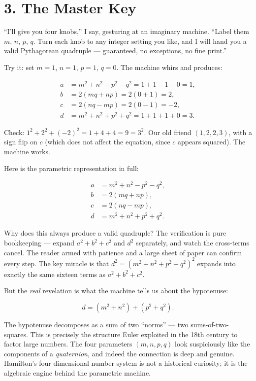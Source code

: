 \section{3. The Master Key}\label{ch12-the-master-key}

``I'll give you four knobs,'' I say, gesturing at an imaginary machine. ``Label them \(m\), \(n\), \(p\), \(q\). Turn each knob to any integer setting you like, and I will hand you a valid Pythagorean quadruple --- guaranteed, no exceptions, no fine print.''

Try it: set \(m = 1\), \(n = 1\), \(p = 1\), \(q = 0\). The machine whirs and produces:

\[\begin{aligned}
a &= m^2 + n^2 - p^2 - q^2 = 1 + 1 - 1 - 0 = 1, \\
b &= 2(mq + np) = 2(0 + 1) = 2, \\
c &= 2(nq - mp) = 2(0 - 1) = -2, \\
d &= m^2 + n^2 + p^2 + q^2 = 1 + 1 + 1 + 0 = 3.
\end{aligned}\]

Check: \(1^2 + 2^2 + (-2)^2 = 1 + 4 + 4 = 9 = 3^2\). Our old friend \((1, 2, 2, 3)\), with a sign flip on \(c\) (which does not affect the equation, since \(c\) appears squared). The machine works.

Here is the parametric representation in full:

\[\boxed{\begin{aligned}
a &= m^2 + n^2 - p^2 - q^2, \\
b &= 2(mq + np), \\
c &= 2(nq - mp), \\
d &= m^2 + n^2 + p^2 + q^2.
\end{aligned}}\]

Why does this always produce a valid quadruple? The verification is pure bookkeeping --- expand \(a^2 + b^2 + c^2\) and \(d^2\) separately, and watch the cross-terms cancel. The reader armed with patience and a large sheet of paper can confirm every step. The key miracle is that \(d^2 = (m^2 + n^2 + p^2 + q^2)^2\) expands into exactly the same sixteen terms as \(a^2 + b^2 + c^2\).

But the \emph{real} revelation is what the machine tells us about the hypotenuse:

\[d = (m^2 + n^2) + (p^2 + q^2).\]

The hypotenuse decomposes as a sum of two ``norms'' --- two sums-of-two-squares. This is precisely the structure Euler exploited in the 18th century to factor large numbers. The four parameters \((m, n, p, q)\) look suspiciously like the components of a \emph{quaternion}, and indeed the connection is deep and genuine. Hamilton's four-dimensional number system is not a historical curiosity; it is the algebraic engine behind the parametric machine.


